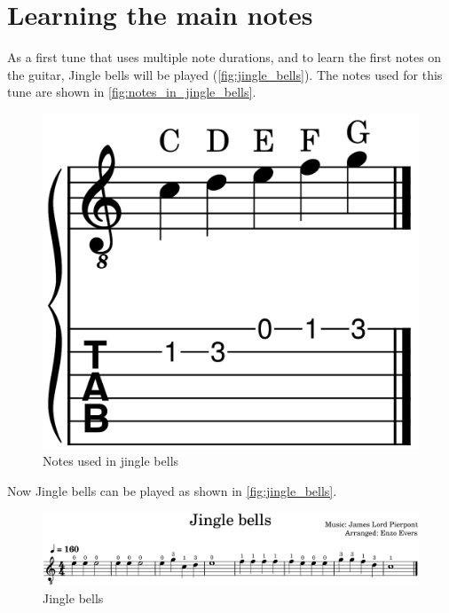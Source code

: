 \newpage

\section{Learning the main notes}

As a first tune that uses multiple note durations, and to learn the first notes on the guitar, Jingle bells will be played (\autoref{fig:jingle_bells}). The notes used for this tune are shown in \autoref{fig:notes_in_jingle_bells}.

\begin{figure}[h]
	\centering
	\includegraphics[height=0.12\textheight]{../../MuseScore/Guitar/NotesInJingleBells.png}
	\caption{Notes used in jingle bells}
	\label{fig:notes_in_jingle_bells}
\end{figure}

Now Jingle bells can be played as shown in \autoref{fig:jingle_bells}.

\begin{figure}[h]
	\centering
	\includegraphics[width=\textwidth]{../../MuseScore/Guitar/GuitarJingleBells.png}
	\caption{Jingle bells}
	\label{fig:jingle_bells}
\end{figure}

